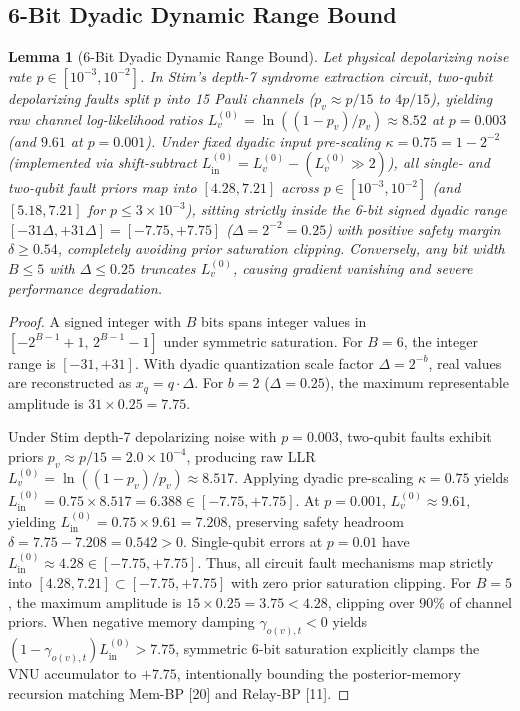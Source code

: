 \documentclass[journal]{IEEEtran}
\newtheorem{lemma}{Lemma}
\begin{document}
\subsection{6-Bit Dyadic Dynamic Range Bound}
\begin{lemma}[6-Bit Dyadic Dynamic Range Bound]
Let physical depolarizing noise rate $p \in [10^{-3}, 10^{-2}]$. In Stim's depth-7 syndrome extraction circuit, two-qubit depolarizing faults split $p$ into 15 Pauli channels ($p_v \approx p/15$ to $4p/15$), yielding raw channel log-likelihood ratios $L_v^{(0)} = \ln((1-p_v)/p_v) \approx 8.52$ at $p = 0.003$ (and $9.61$ at $p = 0.001$). Under fixed dyadic input pre-scaling $\kappa = 0.75 = 1 - 2^{-2}$ (implemented via shift-subtract $L_{\text{in}}^{(0)} = L_v^{(0)} - (L_v^{(0)} \gg 2)$), all single- and two-qubit fault priors map into $[4.28, 7.21]$ across $p \in [10^{-3}, 10^{-2}]$ (and $[5.18, 7.21]$ for $p \le 3 \times 10^{-3}$), sitting strictly inside the 6-bit signed dyadic range $[-31\Delta, +31\Delta] = [-7.75, +7.75]$ ($\Delta = 2^{-2} = 0.25$) with positive safety margin $\delta \ge 0.54$, completely avoiding prior saturation clipping. Conversely, any bit width $B \le 5$ with $\Delta \le 0.25$ truncates $L_v^{(0)}$, causing gradient vanishing and severe performance degradation.
\end{lemma}

\begin{proof}
A signed integer with $B$ bits spans integer values in $[-2^{B-1}+1, \, 2^{B-1}-1]$ under symmetric saturation. For $B=6$, the integer range is $[-31, +31]$. With dyadic quantization scale factor $\Delta = 2^{-b}$, real values are reconstructed as $x_q = q \cdot \Delta$. For $b=2$ ($\Delta = 0.25$), the maximum representable amplitude is $31 \times 0.25 = 7.75$.

Under Stim depth-7 depolarizing noise with $p = 0.003$, two-qubit faults exhibit priors $p_v \approx p/15 = 2.0 \times 10^{-4}$, producing raw LLR $L_v^{(0)} = \ln((1-p_v)/p_v) \approx 8.517$. Applying dyadic pre-scaling $\kappa = 0.75$ yields $L_{\text{in}}^{(0)} = 0.75 \times 8.517 = 6.388 \in [-7.75, +7.75]$. At $p = 0.001$, $L_v^{(0)} \approx 9.61$, yielding $L_{\text{in}}^{(0)} = 0.75 \times 9.61 = 7.208$, preserving safety headroom $\delta = 7.75 - 7.208 = 0.542 > 0$. Single-qubit errors at $p=0.01$ have $L_{\text{in}}^{(0)} \approx 4.28 \in [-7.75, +7.75]$. Thus, all circuit fault mechanisms map strictly into $[4.28, 7.21] \subset [-7.75, +7.75]$ with zero prior saturation clipping. For $B=5$, the maximum amplitude is $15 \times 0.25 = 3.75 < 4.28$, clipping over $90\%$ of channel priors. When negative memory damping $\gamma_{o(v), t} < 0$ yields $(1 - \gamma_{o(v), t}) L_{\text{in}}^{(0)} > 7.75$, symmetric 6-bit saturation explicitly clamps the VNU accumulator to $+7.75$, intentionally bounding the posterior-memory recursion matching Mem-BP [20] and Relay-BP [11].
\end{proof}
\end{document}
